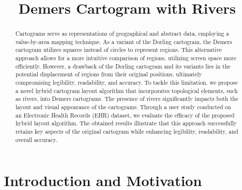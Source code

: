 \documentclass[Afour,sagev,times]{sagej}
\begin{document}
\title{Demers Cartogram with Rivers}

\begin{abstract}
    Cartograms serve as representations of geographical and abstract data, employing a value-by-area mapping technique.
    As a variant of the Dorling cartogram, the Demers cartogram utilizes squares instead of circles to represent regions.
    This alternative approach allows for a more intuitive comparison of regions, utilizing screen space more efficiently.
    However, a drawback of the Dorling cartogram and its variants lies in the potential displacement of regions from their original positions, ultimately compromising legibility, readability, and accuracy.
    To tackle this limitation, we propose a novel hybrid cartogram layout algorithm that incorporates topological elements, such as rivers, into Demers cartograms.
    The presence of rivers significantly impacts both the layout and visual appearance of the cartograms.
    Through a user study conducted on an Electronic Health Records (EHR) dataset, we evaluate the efficacy of the proposed hybrid layout algorithm.
    The obtained results illustrate that this approach successfully retains key aspects of the original cartogram while enhancing legibility, readability, and overall accuracy.
\end{abstract}


\maketitle

\section{Introduction and Motivation}
\end{document}
